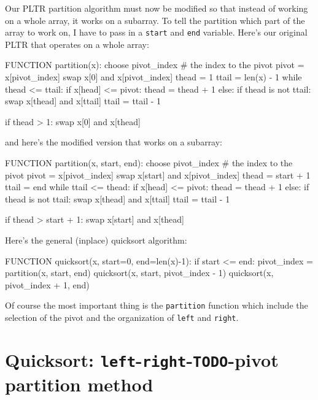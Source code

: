 Our PLTR partition algorithm must now be modified so that
instead of working on a whole array, it works on a subarray.
To tell the partition which part of the array to work on, I have
to pass in a \verb!start! and \verb!end! variable.
Here's our original PLTR that operates on a whole array:
\begin{console}
FUNCTION partition(x):
    choose pivot_index # the index to the pivot
    pivot = x[pivot_index]
    swap x[0] and x[pivot_index]
    thead = 1
    ttail = len(x) - 1
    while thead <= ttail:
        if x[head] <= pivot:
            thead = thead + 1
        else:
            if thead is not ttail:
                swap x[thead] and x[ttail]
            ttail = ttail - 1
    
    if thead > 1:
        swap x[0] and x[thead]
\end{console}
and here's the modified version that works on a subarray:
\begin{console}
FUNCTION partition(x, start, end):
    choose pivot_index # the index to the pivot
    pivot = x[pivot_index]
    swap x[start] and x[pivot_index]
    thead = start + 1
    ttail = end
    while ttail <= thead:
        if x[head] <= pivot:
            thead = thead + 1
        else:
            if thead is not ttail:
                swap x[thead] and x[ttail]
            ttail = ttail - 1
    
    if thead > start + 1:
        swap x[start] and x[thead]
\end{console}





Here's the general (inplace) quicksort algorithm:
\begin{console}
FUNCTION quicksort(x, start=0, end=len(x)-1):
if start <= end:
    pivot_index = partition(x, start, end)
    quicksort(x, start, pivot_index - 1)
    quicksort(x, pivot_index + 1, end)
\end{console}

Of course the most important thing is the \verb!partition!
function which include the selection of the pivot and the
organization of \verb!left! and \verb!right!.




\newpage
\section{Quicksort: \texttt{left}-\texttt{right}-\texttt{TODO}-pivot partition method}

